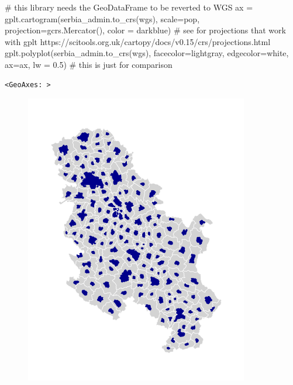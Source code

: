 \documentclass[
  letterpaper,
  DIV=11,
  numbers=noendperiod]{scrreprt}
\newenvironment{Shaded}{\begin{snugshade}}{\end{snugshade}}
\newcommand{\CommentTok}[1]{\textcolor[rgb]{0.37,0.37,0.37}{#1}}
\newcommand{\FloatTok}[1]{\textcolor[rgb]{0.68,0.00,0.00}{#1}}
\newcommand{\NormalTok}[1]{\textcolor[rgb]{0.00,0.23,0.31}{#1}}
\newcommand{\OperatorTok}[1]{\textcolor[rgb]{0.37,0.37,0.37}{#1}}
\newcommand{\StringTok}[1]{\textcolor[rgb]{0.13,0.47,0.30}{#1}}
\begin{document}
\begin{Shaded}
\begin{Highlighting}[]
\CommentTok{\# this library needs the GeoDataFrame to be reverted to WGS}
\NormalTok{ax }\OperatorTok{=}\NormalTok{ gplt.cartogram(serbia\_admin.to\_crs(wgs), scale}\OperatorTok{=}\StringTok{\textquotesingle{}pop\textquotesingle{}}\NormalTok{, projection}\OperatorTok{=}\NormalTok{gcrs.Mercator(), color }\OperatorTok{=} \StringTok{\textquotesingle{}darkblue\textquotesingle{}}\NormalTok{)}
\CommentTok{\# see for projections that work with gplt https://scitools.org.uk/cartopy/docs/v0.15/crs/projections.html}
\NormalTok{gplt.polyplot(serbia\_admin.to\_crs(wgs), facecolor}\OperatorTok{=}\StringTok{\textquotesingle{}lightgray\textquotesingle{}}\NormalTok{, edgecolor}\OperatorTok{=}\StringTok{\textquotesingle{}white\textquotesingle{}}\NormalTok{, ax}\OperatorTok{=}\NormalTok{ax, lw }\OperatorTok{=} \FloatTok{0.5}\NormalTok{) }\CommentTok{\# this is just for comparison}
\end{Highlighting}
\end{Shaded}

\begin{verbatim}
<GeoAxes: >
\end{verbatim}

\begin{figure}[H]

{\centering \includegraphics{labs/w02_maps_files/figure-pdf/cell-49-output-2.png}

}

\end{figure}
\end{document}
